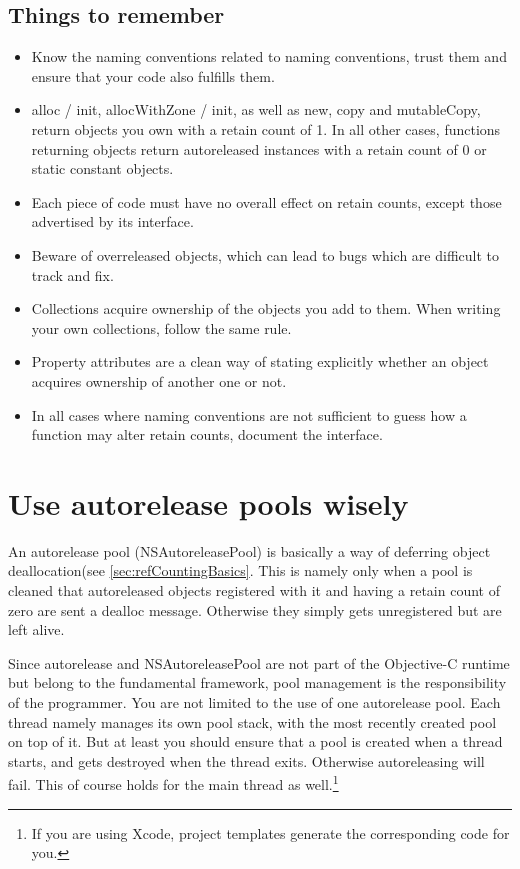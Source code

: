 \subsection{Things to remember}
\begin{itemize}
\item Know the naming conventions related to naming conventions, trust them and ensure that your code also fulfills them.
\item alloc / init, allocWithZone / init, as well as new, copy and mutableCopy, return objects you own with a retain count of 1. In all other cases, functions returning objects return autoreleased instances with a retain count of 0 or static constant objects.
\item Each piece of code must have no overall effect on retain counts, except those advertised by its interface.
\item Beware of overreleased objects, which can lead to bugs which are difficult to track and fix.
\item Collections acquire ownership of the objects you add to them. When writing your own collections, follow the same rule.
\item Property attributes are a clean way of stating explicitly whether an object acquires ownership of another one or not.
\item In all cases where naming conventions are not sufficient to guess how a function may alter retain counts, document the interface.
\end{itemize}

\section{Use autorelease pools wisely}\label{sec:autoreleasePools}
An autorelease pool (NSAutoreleasePool) is basically a way of deferring object deallocation(see \ref{sec:refCountingBasics}. This is namely only when a pool is cleaned that autoreleased objects registered with it and having a retain count of zero are sent a dealloc message. Otherwise they simply gets unregistered but are left alive.

Since autorelease and NSAutoreleasePool are not part of the Objective-C runtime but belong to the fundamental framework, pool management is the responsibility of the programmer. You are not limited to the use of one autorelease pool. Each thread namely manages its own pool stack, with the most recently created pool on top of it. But at least you should ensure that a pool is created when a thread starts, and gets destroyed when the thread exits. Otherwise autoreleasing will fail. This of course holds for the main thread as well.\footnote{If you are using Xcode, project templates generate the corresponding code for you.} 

